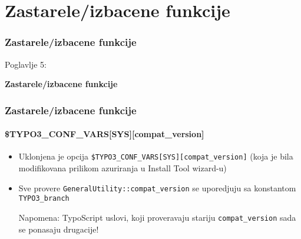 %

\section{Zastarele/izbacene funkcije}
\begin{frame}[fragile]
	\frametitle{Zastarele/izbacene funkcije}

	\begin{center}\huge{Poglavlje 5:}\end{center}
	\begin{center}\huge{\color{typo3darkgrey}\textbf{Zastarele/izbacene funkcije}}\end{center}

\end{frame}


\begin{frame}[fragile]
	\frametitle{Zastarele/izbacene funkcije}
	\framesubtitle{\$TYPO3\_CONF\_VARS[SYS][compat\_version]}

	\begin{itemize}

		\item Uklonjena je opcija \texttt{\$TYPO3\_CONF\_VARS[SYS][compat\_version]} (koja je bila modifikovana prilikom azuriranja u Install Tool wizard-u)

		\item Sve provere \texttt{GeneralUtility::compat\_version} se uporedjuju sa konstantom \texttt{TYPO3\_branch}

			\vspace{0.2cm}

			\begingroup
				\color{red}
					Napomena: TypoScript uslovi, koji proveravaju stariju \texttt{compat\_version} 
					sada se ponasaju drugacije!
			\endgroup

	\end{itemize}

\end{frame}

